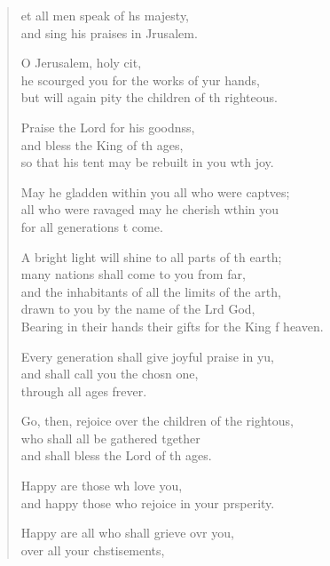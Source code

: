 \settowidth{\versewidth}{Bearing in their hands their gifts for the King of heaven.}
\begin{verse}%
  \begin{patverse}
et all men speak of h\pointup{\i}s majesty,\Med\\
and sing his praises in Jrusalem.

O Jerusalem, holy cit,\Flex\\
he scourged you for the works of yur hands,\Med\\
but will again pity the children of th righteous.

Praise the Lord for his goodnss,\Flex\\
and bless the King of th ages,\Med\\
so that his tent may be rebuilt in you w\pointup{\i}th joy.

May he gladden within you all who were capt\pointup{\i}ves;\Flex\\
all who were ravaged may he cherish w\pointup{\i}thin you\Med\\
for all generations t come.

A bright light will shine to all parts of th earth;\Med\\
many nations shall come to you from far,\\
and the inhabitants of all the limits of the arth,\Flex\\
drawn to you by the name of the Lrd God,\Med\\
Bearing in their hands their gifts for the King f heaven.

Every generation shall give joyful praise in yu,\Flex\\
and shall call you the chosn one,\Med\\
through all ages frever.

Go, then, rejoice over the children of the rightous,\Flex\\
who shall all be gathered tgether\Med\\
and shall bless the Lord of th ages.

Happy are those wh love you,\Med\\
and happy those who rejoice in your prsperity.

Happy are all who shall grieve ovr you,\Med\\
over all your chstisements,


\end{patverse}
\end{verse}
